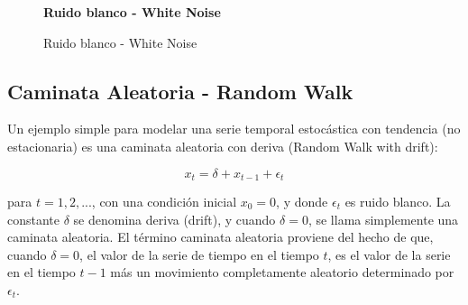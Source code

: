 \begin{figure}[h]
	\centering
	\textbf{Ruido blanco - White Noise}\par\medskip
	\caption{Ruido blanco - White Noise}\label{figura6}
\end{figure}

\subsection{Caminata Aleatoria - Random Walk}

Un ejemplo simple para modelar una serie temporal estoc\'astica con tendencia (no estacionaria) es una caminata aleatoria con deriva (Random Walk with drift):

\begin{equation*}
x_t = \delta + x_{t-1} + \epsilon_t 
\end{equation*}

para $t = 1, 2,. . .$, con una condici\'on inicial $x_0 = 0$, y donde $\epsilon_t$ es ruido blanco. La constante $\delta$ se denomina deriva (drift), y cuando $\delta=0$, se llama simplemente una caminata aleatoria. El t\'ermino caminata aleatoria proviene del hecho de que, cuando $\delta=0$, el valor de la serie de tiempo en el tiempo $t$, es el valor de la serie en el tiempo $t - 1$ m\'as un movimiento completamente aleatorio determinado por $\epsilon_t$. 

